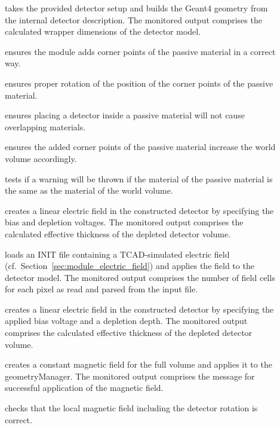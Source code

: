 \begin{description}
    \item[] takes the provided detector setup and builds the Geant4 geometry from the internal detector description. The monitored output comprises the calculated wrapper dimensions of the detector model.
    \item[] ensures the module adds corner points of the passive material in a correct way.
    \item[] ensures proper rotation of the position of the corner points of the passive material.
    \item[] ensures placing a detector inside a passive material will not cause overlapping materials.
    \item[] ensures the added corner points of the passive material increase the world volume accordingly.
    \item[] tests if a warning will be thrown if the material of the passive material is the same as the material of the world volume.
    \item[] creates a linear electric field in the constructed detector by specifying the bias and depletion voltages. The monitored output comprises the calculated effective thickness of the depleted detector volume.
    \item[] loads an INIT file containing a TCAD-simulated electric field (cf.\ Section~\ref{sec:module_electric_field}) and applies the field to the detector model. The monitored output comprises the number of field cells for each pixel as read and parsed from the input file.
    \item[] creates a linear electric field in the constructed detector by specifying the applied bias voltage and a depletion depth. The monitored output comprises the calculated effective thickness of the depleted detector volume.
    \item[] creates a constant magnetic field for the full volume and applies it to the geometryManager. The monitored output comprises the message for successful application of the magnetic field.
    \item[] checks that the local magnetic field including the detector rotation is correct.

\end{description}
